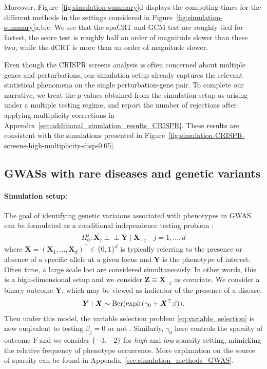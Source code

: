 \documentclass[12pt]{article}
\theoremstyle{definition}
\newcommand{\indep}{\perp \!\!\! \perp}
\newcommand{\expit}{\mathrm{expit}}                 	%
\newcommand{\prx}{\bm X}								%
\newcommand{\prz}{\bm Z}								%
\newcommand{\pry}{{\bm Y}}								%
\begin{document}
  
  Moreover, Figure~\ref{fig:simulation-summary}d displays the computing times for the different methods in the settings considered in Figure~\ref{fig:simulation-summary}a,b,c. We see that the spaCRT and GCM test are roughly tied for fastest, the score test is roughly half an order of magnitude slower than these two, while the dCRT is more than an order of magnitude slower. 
  
  Even though the CRISPR screens analysis is often concerned about multiple genes and perturbations, our simulation setup already captures the relevant statistical phenomena on the single perturbation-gene pair. To complete our narrative, we treat the $p$-values obtained from the simulation setup as arising under a multiple testing regime, and report the number of rejections after applying multiplicity corrections in Appendix~\ref{sec:additional_simulation_results_CRISPR}. These results are consistent with the simulations presented in Figure~\ref{fig:simulation-CRISPR-screens-high-multiplicity-disp-0.05}. 
  
  \subsection{GWASs with rare diseases and genetic variants}\label{sec:GWAS}
  
  \paragraph{Simulation setup:}
  
  The goal of identifying genetic variaions associated with phenotypes in GWAS can be formulated as a conditional independence testing problem \citep{sesia2019gene}:
  \begin{align}\label{eq:variable_selection}
	H_0^j:\prx_j\indep \pry\mid \prx_{-j}\quad j=1,\ldots,d
  \end{align}
  where $\prx=(\prx_1,\ldots,\prx_d)^\top\in\{0,1\}^d$ is typically referring to the presence or absence of a specific allele at a given locus and $\pry$ is the phenotype of interest. Often time, a large scale loci are considered simultaneously. In other words, this is a high-dimensional setup and we consider $\prz\equiv \prx_{-j}$ as covariate. We consider a binary outcome $\pry$, which may be viewed as indicator of the presence of a disease:
  \begin{align*}
	  \bm Y \mid \bm X\sim \textnormal{Ber}(\expit(\gamma_0 + \prx^\top \beta)).
  \end{align*}
  Then under this model, the variable selection problem \eqref{eq:variable_selection} is now euqivalent to testing $\beta_j=0$ or not \citep{CetL16}. Similarly, $\gamma_0$ here controls the sparsity of outcome $Y$ and we consider $\{-3,-2\}$ for \textit{high} and \textit{low} sparsity setting, mimicking the relative frequency of phenotype occurrence. More explanation on the source of sparsity can be found in Appendix~\ref{sec:simulation_methods_GWAS}.
  
\end{document}
